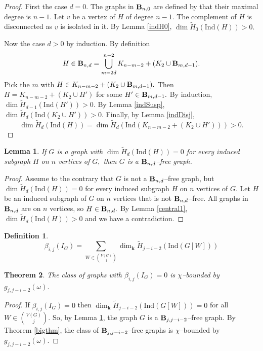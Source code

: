 \documentclass{article}
\theoremstyle{plain}
\newtheorem{thm}{Theorem}
\newtheorem{lem}[thm]{Lemma}
\theoremstyle{definition}
\newtheorem{defn}{Definition}
\begin{document}
\begin{proof}
First the case $d=0.$ The graphs in ${\bf B}_{n,0}$
are defined by that their maximal degree is $n-1.$ Let $v$ be a vertex of $H$ of degree $n-1.$ The complement of $H$ is disconnected as $v$ is isolated in it. By Lemma \ref{indH0}, $\dim \tilde{H}_0(\mathrm{Ind}(H)) > 0.$

Now the case $d>0$ by induction. By definition
\[ H \in {\bf B}_{n,d} = \bigcup_{m=2d}^{n-2} K_{n-m-2}+(K_2\cup {\bf B}_{m,d-1}). \]
Pick the $m$ with $H \in K_{n-m-2}+(K_2\cup {\bf B}_{m,d-1}).$ Then $H = K_{n-m-2}+(K_2\cup H')$ for some $H'\in {\bf B}_{m,d-1}.$ By induction, $\dim \tilde{H}_{d-1}(\mathrm{Ind}(H')) > 0.$ By Lemma \ref{indSusp}, 
$\dim \tilde{H}_{d}(\mathrm{Ind}(K_2\cup H')) > 0.$ Finally, by Lemma \ref{indDisj},
\[
\dim \tilde{H}_d(\mathrm{Ind}(H)) = \dim \tilde{H}_{d}(\mathrm{Ind}(K_{n-m-2}+(K_2\cup H')))>0.
\]
\end{proof}

\begin{lem} \label{central2}
If $G$ is a graph with $\dim \tilde{H}_{d}(\mathrm{Ind}(H)) = 0$ for every induced subgraph $H$ on $n$ vertices of $G,$ then $G$ is a ${\bf B}_{n,d}$--free graph.
\end{lem}
\begin{proof}
Assume to the contrary that $G$ is not a ${\bf B}_{n,d}$--free graph, but\linebreak $\dim \tilde{H}_d(\mathrm{Ind}(H)) = 0$ for every induced subgraph $H$ on $n$ vertices of $G.$
Let $H$ be an induced subgraph of  $G$  on $n$ vertices that is not ${\bf B}_{n,d}$--free. All graphs in ${\bf B}_{n,d}$ are on $n$ vertices, so $H \in {\bf B}_{n,d}.$
By Lemma \ref{central1},  $\dim \tilde{H}_d(\mathrm{Ind}(H)) > 0$ and we have a contradiction.
\end{proof}

\begin{defn}
\[
\beta_{i,j}(I_G) = \sum_{W \in { V(G) \choose j } } \dim_{\mathbf k}\tilde{H}_{j-i-2}(\mathrm{Ind}(G[W]))
\]
\end{defn}

\begin{thm} \label{mainThm}
The class of graphs with $ \beta_{i,j}(I_G) = 0$ is $\chi$--bounded by $g_{j,j-i-2}(\omega).$
\end{thm}
\begin{proof}
If $ \beta_{i,j}(I_G) = 0 $ then 
$ \dim_{\mathbf k}\tilde{H}_{j-i-2}(\mathrm{Ind}(G[W])) = 0 $ for all $W \in { V(G) \choose j }.$
So, by Lemma \ref{central2}, the graph $G$ is a ${\bf B}_{j,j-i-2}$--free graph.
By Theorem \ref{bigthm}, the class of  ${\bf B}_{j,j-i-2}$--free graphs is $\chi$--bounded by $g_{j,j-i-2}(\omega).$
\end{proof}
\end{document}
